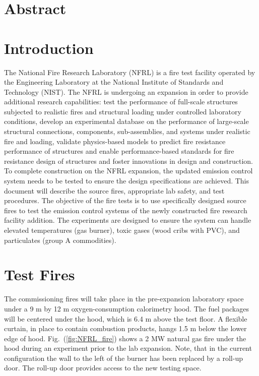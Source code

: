 \documentclass[12pt,oneside]{book}
\begin{document}
\mainmatter

\chapter*{\centering Abstract}

\chapter{Introduction}
\setcounter{page}{1}
The National Fire Research Laboratory (NFRL) is a fire test facility operated by the Engineering Laboratory at the National Institute of Standards and Technology (NIST). The NFRL is undergoing an expansion in order to provide additional research capabilities: test the performance of full-scale structures subjected to realistic fires and structural loading under controlled laboratory conditions, develop an experimental database on the performance of large-scale structural connections, components, sub-assemblies, and systems under realistic fire and loading, validate physics-based models to predict fire resistance performance of structures and enable performance-based standards for fire resistance design of structures and foster innovations in design and construction. To complete construction on the NFRL expansion, the updated emission control system needs to be tested to ensure the design specifications are achieved. This document will describe the source fires, appropriate lab safety, and test procedures. The objective of the fire tests is to use specifically designed source fires to test the emission control systems of the newly constructed fire research facility addition. The experiments are designed to ensure the system can handle elevated temperatures (gas burner), toxic gases (wood cribs with PVC), and particulates (group A commodities).

\chapter{Test Fires}
\label{test_fire}
The commissioning fires will take place in the pre-expansion laboratory space under a 9 m by 12 m oxygen-consumption calorimetry hood. The fuel packages will be centered under the hood, which is 6.4 m above the test floor. A flexible curtain, in place to contain combustion products, hangs 1.5 m below the lower edge of hood. Fig.~(\ref{fig:NFRL_fire}) shows a 2 MW natural gas fire under the hood during an experiment prior to the lab expansion. Note, that in the current configuration the wall to the left of the burner has been replaced by a roll-up door. The roll-up door provides access to the new testing space.
\end{document}
